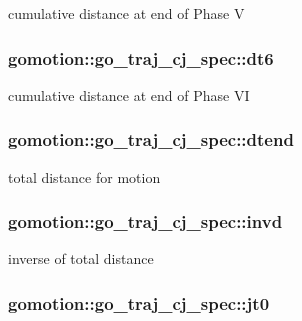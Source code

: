 cumulative distance at end of Phase V 

\hypertarget{structgomotion_1_1go__traj__cj__spec_ac9046b535c1e0a5d68570b077af1bce0}{
\subsubsection[{dt6}]{ gomotion\-::go\-\_\-traj\-\_\-cj\-\_\-spec\-::dt6}}\label{structgomotion_1_1go__traj__cj__spec_ac9046b535c1e0a5d68570b077af1bce0}


cumulative distance at end of Phase V\-I 

\hypertarget{structgomotion_1_1go__traj__cj__spec_a89238023b9a1f80d4b4b7fa5b38967ce}{
\subsubsection[{dtend}]{ gomotion\-::go\-\_\-traj\-\_\-cj\-\_\-spec\-::dtend}}\label{structgomotion_1_1go__traj__cj__spec_a89238023b9a1f80d4b4b7fa5b38967ce}


total distance for motion 

\hypertarget{structgomotion_1_1go__traj__cj__spec_a00a890b5f1f58c05c7ec7d30c92712d6}{
\subsubsection[{invd}]{ gomotion\-::go\-\_\-traj\-\_\-cj\-\_\-spec\-::invd}}\label{structgomotion_1_1go__traj__cj__spec_a00a890b5f1f58c05c7ec7d30c92712d6}


inverse of total distance 

\hypertarget{structgomotion_1_1go__traj__cj__spec_a1648dabad4bde3ac763637ff03e7569e}{
\subsubsection[{jt0}]{ gomotion\-::go\-\_\-traj\-\_\-cj\-\_\-spec\-::jt0}}\label{structgomotion_1_1go__traj__cj__spec_a1648dabad4bde3ac763637ff03e7569e}


